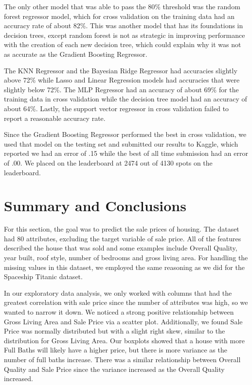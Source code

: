 \documentclass[fleqn,10pt]{SelfArx} %
\begin{document}
The only other model that was able to pass the 80\% threshold was the random forest regressor model, which for cross validation on the training data had an accuracy rate of about 82\%. This was another model that has its foundations in decision trees, except random forest is not as strategic in improving performance with the creation of each new decision tree, which could explain why it was not as accurate as the Gradient Boosting Regressor. 

The KNN Regressor and the Bayesian Ridge Regressor had accuracies slightly above 72\% while Lasso and Linear Regression models had accuracies that were slightly below 72\%. The MLP Regressor had an accuracy of about 69\% for the training data in cross validation while the decision tree model had an accuracy of about 64\%. Lastly, the support vector regressor in cross validation failed to report a reasonable accuracy rate. 

Since the Gradient Boosting Regressor performed the best in cross validation, we used that model on the testing set and submitted our results to Kaggle, which reported we had an error of .15 while the best of all time submission had an error of .00. We placed on the leaderboard at 2474 out of 4130 spots on the leaderboard. 


\section{Summary and Conclusions}

For this section, the goal was to predict the sale prices of housing. The dataset had 80 attributes, excluding the target variable of sale price. All of the features described the house that was sold and some examples include Overall Quality, year built, roof style, number of bedrooms and gross living area. For handling the missing values in this dataset, we employed the same reasoning as we did for the Spaceship Titanic dataset. 

In our exploratory data analysis, we only worked with columns that had the greatest correlation with sale price since the number of attributes was high, so we wanted to narrow it down. We noticed a strong positive relationship between Gross Living Area and Sale Price via a scatter plot. Additionally, we found Sale Price was normally distributed but with a slight right skew, similar to the distribution for Gross Living Area. Our boxplots showed that a house with more Full Baths will likely have a higher price, but there is more variance as the number of full baths increase. There was a similar relationship between Overall Quality and Sale Price since the variance increased as the Overall Quality increased. 
\end{document}
